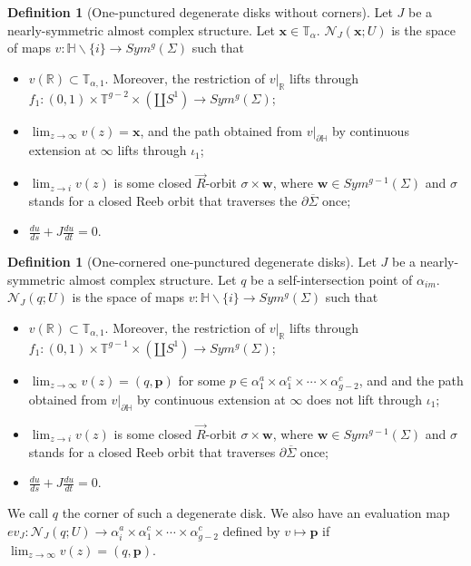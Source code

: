 \documentclass{amsart}
\theoremstyle{definition}
\newtheorem{defn}[thm]{Definition}
\theoremstyle{remark}
\numberwithin{equation}{section}
\numberwithin{equation}{section} \makeatletter
\begin{document}
\begin{defn}[One-punctured degenerate disks without corners]
Let $J$ be a nearly-symmetric almost complex structure. Let $\bm{x}\in  \mathbb{T}_{\alpha}$. $\mathcal{N}_J(\bm{x};U)$ is the space of maps $v:\mathbb{H}\backslash\{i\}\rightarrow Sym^g(\Sigma)$ such that 
\begin{itemize}
\item[(1)]$v(\mathbb{R})\subset \mathbb{T}_{\alpha,1}$. Moreover, the restriction of $v|_{\mathbb{R}}$ lifts through $f_1:(0,1)\times \mathbb{T}^{g-2}\times(\amalg S^1)\rightarrow Sym^g(\Sigma)$;
\item[(2)]$\lim_{z\rightarrow \infty}v(z)=\bm{x}$, and the path obtained from $v|_{\partial \mathbb{H}}$ by continuous extension at $\infty$ lifts through $\iota_1$;
\item[(3)]$\lim_{z\rightarrow i}v(z)$ is some closed $\overrightarrow{R}$-orbit $\sigma \times \bm{w}$, where $\bm{w}\in Sym^{g-1}(\Sigma)$ and $\sigma$ stands for a closed Reeb orbit that traverses the $\partial \overline{\Sigma}$ once;
\item[(4)]$\frac{du}{ds}+J\frac{du}{dt}=0$.
\end{itemize}
\end{defn}
\begin{defn}[One-cornered one-punctured degenerate disks]
Let $J$ be a nearly-symmetric almost complex structure. Let $q$ be a self-intersection point of $\alpha_{im}$. $\mathcal{N}_J(q;U)$ is the space of maps $v:\mathbb{H}\backslash\{i\}\rightarrow Sym^g(\Sigma)$ such that 
\begin{itemize}
\item[(1)]$v(\mathbb{R})\subset \mathbb{T}_{\alpha,1}$. Moreover, the restriction of $v|_{\mathbb{R}}$ lifts through $f_1:(0,1)\times \mathbb{T}^{g-1}\times (\amalg S^1)\rightarrow Sym^g(\Sigma)$;
\item[(2)]$\lim_{z\rightarrow \infty}v(z)=(q,\bm{p})$ for some $p\in \alpha^a_1\times\alpha^c_1\times\cdots\times \alpha^c_{g-2}$, and and the path obtained from $v|_{\partial \mathbb{H}}$ by continuous extension at $\infty$ does not lift through $\iota_1$;
\item[(3)]$\lim_{z\rightarrow i}v(z)$ is some closed $\overrightarrow{R}$-orbit $\sigma \times \bm{w}$, where $\bm{w}\in Sym^{g-1}(\Sigma)$ and $\sigma$ stands for a closed Reeb orbit that traverses $\partial \overline{\Sigma}$ once;
\item[(4)]$\frac{du}{ds}+J\frac{du}{dt}=0$.
\end{itemize}
\end{defn}
We call $q$ the corner of such a degenerate disk. We also have an evaluation map $ev_J:\mathcal{N}_J(q;U)\rightarrow \alpha^a_i\times\alpha^c_1\times\cdots\times\alpha_{g-2}^c$ defined by $v\mapsto \bm{p}$ if $\lim_{z\rightarrow \infty}v(z)=(q,\bm{p})$.
\end{document}
